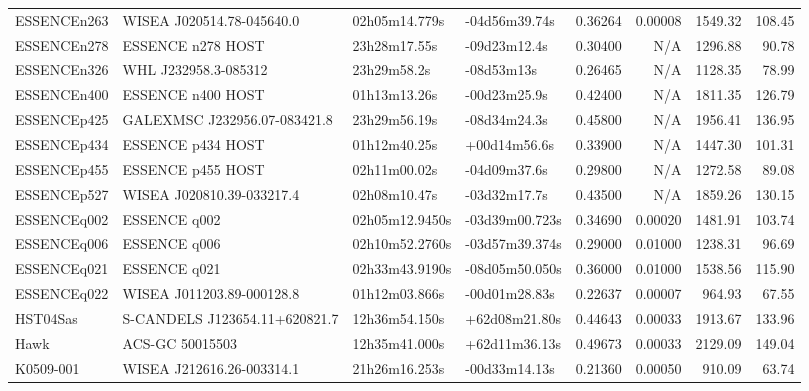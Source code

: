 \begin{longtable}{llllrrrr}
ESSENCEn263      &       WISEA J020514.78-045640.0 &   02h05m14.779s &   -04d56m39.74s &  0.36264 &  0.00008 &  1549.32 &      108.45 \\
ESSENCEn278      &               ESSENCE n278 HOST &    23h28m17.55s &    -09d23m12.4s &  0.30400 &      N/A &  1296.88 &       90.78 \\
ESSENCEn326      &            WHL J232958.3-085312 &     23h29m58.2s &      -08d53m13s &  0.26465 &      N/A &  1128.35 &       78.99 \\
ESSENCEn400      &               ESSENCE n400 HOST &    01h13m13.26s &    -00d23m25.9s &  0.42400 &      N/A &  1811.35 &      126.79 \\
ESSENCEp425      &  GALEXMSC J232956.07-083421.8   &    23h29m56.19s &    -08d34m24.3s &  0.45800 &      N/A &  1956.41 &      136.95 \\
ESSENCEp434      &               ESSENCE p434 HOST &    01h12m40.25s &    +00d14m56.6s &  0.33900 &      N/A &  1447.30 &      101.31 \\
ESSENCEp455      &               ESSENCE p455 HOST &    02h11m00.02s &    -04d09m37.6s &  0.29800 &      N/A &  1272.58 &       89.08 \\
ESSENCEp527      &       WISEA J020810.39-033217.4 &    02h08m10.47s &    -03d32m17.7s &  0.43500 &      N/A &  1859.26 &      130.15 \\
ESSENCEq002      &                    ESSENCE q002 &  02h05m12.9450s &  -03d39m00.723s &  0.34690 &  0.00020 &  1481.91 &      103.74 \\
ESSENCEq006      &                    ESSENCE q006 &  02h10m52.2760s &  -03d57m39.374s &  0.29000 &  0.01000 &  1238.31 &       96.69 \\
ESSENCEq021      &                    ESSENCE q021 &  02h33m43.9190s &  -08d05m50.050s &  0.36000 &  0.01000 &  1538.56 &      115.90 \\
ESSENCEq022      &       WISEA J011203.89-000128.8 &   01h12m03.866s &   -00d01m28.83s &  0.22637 &  0.00007 &   964.93 &       67.55 \\
HST04Sas         &  S-CANDELS J123654.11+620821.7  &   12h36m54.150s &   +62d08m21.80s &  0.44643 &  0.00033 &  1913.67 &      133.96 \\
Hawk             &                 ACS-GC 50015503 &   12h35m41.000s &   +62d11m36.13s &  0.49673 &  0.00033 &  2129.09 &      149.04 \\
K0509-001        &       WISEA J212616.26-003314.1 &   21h26m16.253s &   -00d33m14.13s &  0.21360 &  0.00050 &   910.09 &       63.74 \\

\end{longtable}
